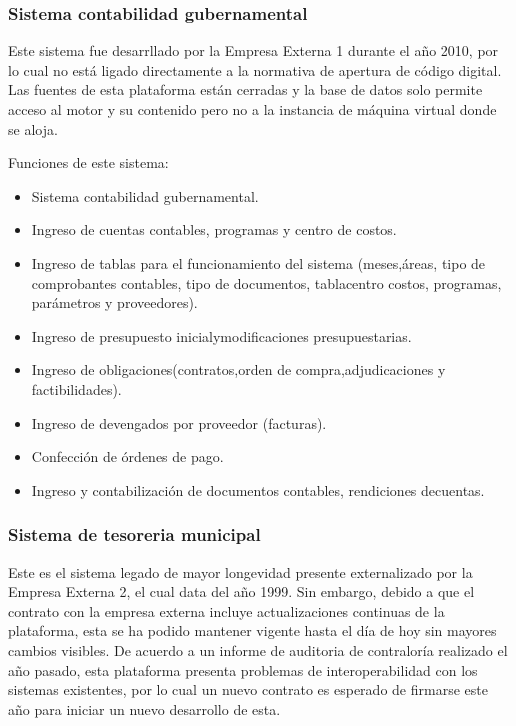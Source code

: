 \subsubsection{Sistema contabilidad gubernamental}
Este sistema fue desarrllado por la Empresa Externa 1 durante el año 2010, por lo cual no está ligado directamente a la normativa de apertura de código digital. Las fuentes de esta plataforma están cerradas y la base de datos solo permite acceso al motor y su contenido pero no a la instancia de máquina virtual donde se aloja.

Funciones de este sistema:
\begin{itemize}
    \item Sistema  contabilidad  gubernamental.
    \item Ingreso de cuentas  contables,  programas  y centro  de costos.
    \item Ingreso   de  tablas   para  el  funcionamiento    del  sistema   (meses,áreas,  tipo  de  comprobantes contables,  tipo  de  documentos,   tablacentro  costos,  programas,  parámetros  y proveedores).
    \item Ingreso de presupuesto  inicialymodificaciones   presupuestarias.
    \item Ingreso de obligaciones(contratos,orden de compra,adjudicaciones  y factibilidades).
    \item Ingreso  de devengados  por proveedor  (facturas).
    \item Confección  de órdenes  de pago.
    \item Ingreso y contabilización   de documentos  contables,  rendiciones  decuentas.
\end{itemize}

\subsubsection{Sistema de tesoreria municipal}

Este es el sistema legado de mayor longevidad presente externalizado por la Empresa Externa 2, el cual data del año 1999. Sin embargo, debido a que el contrato con la empresa externa incluye actualizaciones continuas de la plataforma, esta se ha podido mantener vigente hasta el día de hoy sin mayores cambios visibles. De acuerdo a un informe de auditoria de contraloría realizado el año pasado, esta plataforma presenta problemas de interoperabilidad con los sistemas existentes, por lo cual un nuevo contrato es esperado de firmarse este año para iniciar un nuevo desarrollo de esta.


